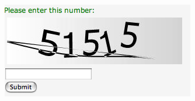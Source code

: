 \documentclass[8pt]{beamer}
\begin{document}
\begin{frame}
\begin{columns}[T]
\begin{column}{.5\textwidth}
       {\includegraphics[width=\textwidth]{imgs/captcha.jpg}}
      \end{column}
      
     \end{columns}   
  \end{frame}
\end{document}
